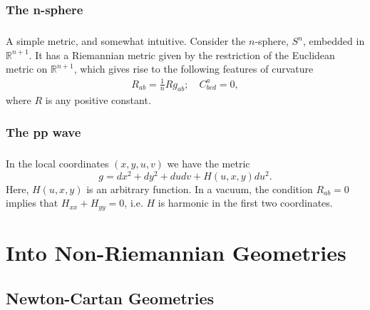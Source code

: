 \documentclass[11pt,fleqn]{report}
\begin{document}
\subsection{The n-sphere}

\paragraph{} A simple metric, and somewhat intuitive. Consider the $n$-sphere, $S^n$, embedded in $\mathbb{R}^{n+1}$. It has a Riemannian metric given by the restriction of the Euclidean metric on $\mathbb{R}^{n+1}$, which gives rise to the following features of curvature
	\begin{align}
		R_{ab} = \tfrac{1}{n} R g_{ab} ;  \quad C^a_{bcd} = 0,
	\end{align}
where $R$ is any positive constant.

\subsection{The pp wave}

\paragraph{} In the local coordinates $(x,y,u,v)$ we have the metric
	\begin{equation}
		g = dx^2 + dy^2 + du dv + H(u,x,y) du^2.
	\end{equation}
Here, $H(u,x,y)$ is an arbitrary function. In a vacuum, the condition $R_{ab} = 0$ implies that $H_{xx} + H_{yy} = 0$, i.e. $H$ is harmonic in the first two coordinates.

\chapter{Into Non-Riemannian Geometries}

\section{Newton-Cartan Geometries}
\end{document}
